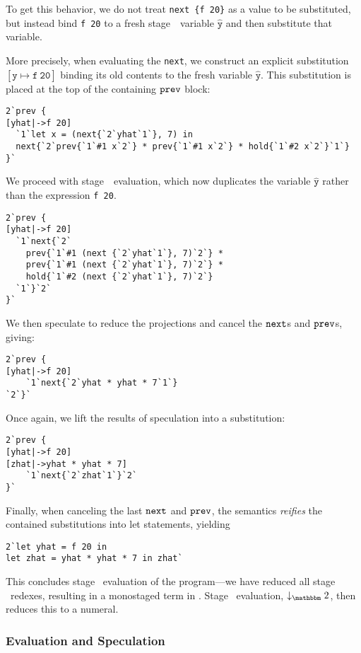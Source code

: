 To get this behavior, we do not treat \verb|next {f 20}| as a value to be substituted, 
but instead bind \verb|f 20| to a fresh stage~\bbtwo\ variable $\mathtt{\hat y}$
and then substitute that variable.

More precisely, when evaluating the \verb|next|, we construct an explicit
substitution $\mathtt{[\hat y\mapsto f~20]}$ binding its old contents to the
fresh variable $\mathtt{\hat y}$. This substitution is placed at the top of the
containing ${\tt prev}$ block:
\begin{lstlisting} 
2`prev {
[yhat|->f 20]
  `1`let x = (next{`2`yhat`1`}, 7) in
  next{`2`prev{`1`#1 x`2`} * prev{`1`#1 x`2`} * hold{`1`#2 x`2`}`1`}
}`
\end{lstlisting}
We proceed with stage~\bbone\ evaluation, which now duplicates the variable
$\mathtt{\hat y}$ rather than the expression \verb|f 20|.
\begin{lstlisting} 
2`prev {
[yhat|->f 20]
  `1`next{`2`
    prev{`1`#1 (next {`2`yhat`1`}, 7)`2`} * 
    prev{`1`#1 (next {`2`yhat`1`}, 7)`2`} *
    hold{`1`#2 (next {`2`yhat`1`}, 7)`2`}
  `1`}`2`
}`
\end{lstlisting}
We then speculate to reduce the projections and cancel the ${\tt next}$s and ${\tt prev}$s, giving:
\begin{lstlisting} 
2`prev {
[yhat|->f 20]
    `1`next{`2`yhat * yhat * 7`1`}
`2`}`
\end{lstlisting}
Once again, we lift the results of speculation into a substitution:
\begin{lstlisting} 
2`prev {
[yhat|->f 20]
[zhat|->yhat * yhat * 7]
    `1`next{`2`zhat`1`}`2`
}`
\end{lstlisting}
Finally, when canceling the last ${\tt next}$ and ${\tt prev}$, the semantics {\em reifies} the contained substitutions into let statements, yielding
\begin{lstlisting} 
2`let yhat = f 20 in
let zhat = yhat * yhat * 7 in zhat`
\end{lstlisting}

This concludes stage \bbone\ evaluation of the program---we have reduced all
stage \bbone\ redexes, resulting in a monostaged term in \langTwo. Stage \bbtwo\
evaluation, $\tworedsym$, then reduces this to a numeral.

\subsubsection{Evaluation and Speculation}
\label{ssec:dynamics}

